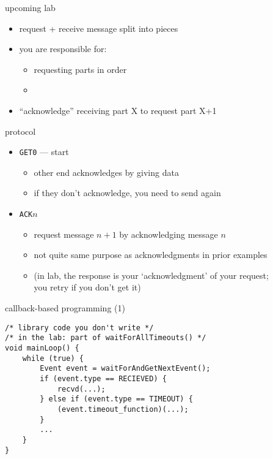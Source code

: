 \begin{frame}{upcoming lab}
    \begin{itemize}
    \item request + receive message split into pieces
    \item you are responsible for:
        \begin{itemize}
        \item requesting parts in order
        \item {}
        \end{itemize}
    \item ``acknowledge'' receiving part X to request part X+1
    \end{itemize}
\end{frame}

\begin{frame}{protocol}
    \begin{itemize}
    \item {\tt GET0} --- start
        \begin{itemize}
        \item other end acknowledges by giving data
        \item if they don't acknowledge, you need to send again
        \end{itemize}
    \item {\tt ACK$n$ }
        \begin{itemize}
        \item request message $n + 1$ by acknowledging message $n$
        \item not quite same purpose as acknowledgments in prior examples
        \item (in lab, the response is your `acknowledgment' of your request; \\
            you retry if you don't get it)
        \end{itemize}
    \end{itemize}
\end{frame}


\begin{frame}[fragile]{callback-based programming (1)}
\begin{Verbatim}[fontsize=\small]
/* library code you don't write */
/* in the lab: part of waitForAllTimeouts() */
void mainLoop() {
    while (true) {
        Event event = waitForAndGetNextEvent();
        if (event.type == RECIEVED) {
            recvd(...);
        } else if (event.type == TIMEOUT) {
            (event.timeout_function)(...);
        }
        ...
    }
}
\end{Verbatim}
\end{frame}

